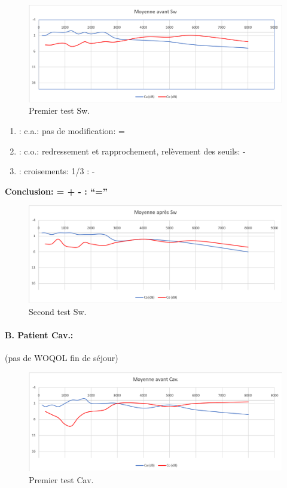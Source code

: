  \begin{figure}[th]
\centering
\includegraphics[width=0.7\linewidth]{images/graphiques/sw_pre.png}
\caption[Moyenne OG+OD]{Premier test Sw.}

\end{figure}

	\begin{enumerate}

 		\item : c.a.: pas de modification: = %

 		\item : c.o.: redressement et rapprochement,
                  relèvement des seuils: -       %
 		\item : croisements: 1/3 :  -

                \end{enumerate}

                \textbf{  Conclusion:  = +  -        : ``=''}

                \begin{figure}[th]
\centering
\includegraphics[width=0.7\linewidth]{images/graphiques/sw_post.png}
\caption[Moyenne OG+OD]{Second test Sw.}

\end{figure}




\paragraph{B. Patient Cav.: }

(pas de WOQOL fin de séjour)


\begin{figure}[th]
\centering
\includegraphics[width=0.7\linewidth]{images/graphiques/cav_pre.png}
\caption[Moyenne OG+OD]{Premier test Cav.}

\end{figure}

